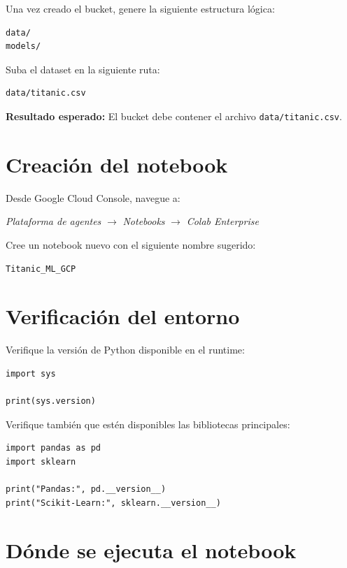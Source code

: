 \documentclass[
  coursetitle={Cómputo Nube y Tecnologías Emergentes},
  coursehours={96},
  coursedate={Verano 2026},
  doctype={Tutorial},
  otherlangs={english,french},
  authorname={Lázaro},
  authorsurname={Bustio-Martínez},
  authortitle={PhD},
  role={Profesor Investigador},
  email={lbustio@inaoe.mx},
  phone={5559504000},
  ext={7459},
  institution={Instituto Nacional de Astrofísica, Óptica y Electrónica (INAOE)},
  department={Maestría en Ciencias en Tecnologías de Seguridad},
  address={Luis Enrique Erro 1, Sta. Ma. Tonantzintla, San Andrés Cholula, CP 72840, Puebla, México},
  margin={0.5in}
]{../../lbustio_lecture_notes}
\begin{document}
Una vez creado el bucket, genere la siguiente estructura lógica:

\begin{lstlisting}
data/
models/
\end{lstlisting}

Suba el dataset en la siguiente ruta:

\begin{lstlisting}
data/titanic.csv
\end{lstlisting}

\textbf{Resultado esperado:} El bucket debe contener el archivo \texttt{data/titanic.csv}.

\section{Creación del notebook}

Desde Google Cloud Console, navegue a:

\begin{center}
    \textit{Plataforma de agentes} \(\rightarrow\) \textit{Notebooks} \(\rightarrow\) \textit{Colab Enterprise}
\end{center}

Cree un notebook nuevo con el siguiente nombre sugerido:

\begin{lstlisting}
Titanic_ML_GCP
\end{lstlisting}

\section{Verificación del entorno}

Verifique la versión de Python disponible en el runtime:

\begin{lstlisting}
import sys

print(sys.version)
\end{lstlisting}

Verifique también que estén disponibles las bibliotecas principales:

\begin{lstlisting}
import pandas as pd
import sklearn

print("Pandas:", pd.__version__)
print("Scikit-Learn:", sklearn.__version__)
\end{lstlisting}

\section{Dónde se ejecuta el notebook}
\end{document}
